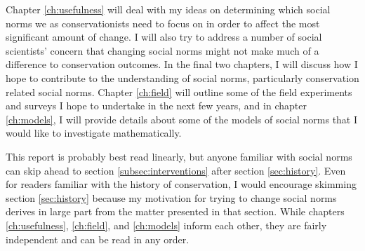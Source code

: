 \documentclass{report}
\begin{document}
Chapter \ref{ch:usefulness} will deal with my ideas on determining which social norms we as conservationists need to focus on in order to affect the most significant amount of change. I will also try to address a number of social scientists' concern that changing social norms might not make much of a difference to conservation outcomes. In the final two chapters, I will discuss how I hope to contribute to the understanding of social norms, particularly conservation related social norms. Chapter \ref{ch:field} will outline some of the field experiments and surveys I hope to undertake in the next few years, and in chapter \ref{ch:models}, I will provide details about some of the models of social norms that I would like to investigate mathematically.

This report is probably best read linearly, but anyone familiar with social norms can skip ahead to section \ref{subsec:interventions} after section \ref{sec:history}. Even for readers familiar with the history of conservation, I would encourage skimming section \ref{sec:history} because my motivation for trying to change social norms derives in large part from the matter presented in that section. While chapters \ref{ch:usefulness}, \ref{ch:field}, and \ref{ch:models} inform each other, they are fairly independent and can be read in any order.

\tableofcontents


\end{document}
